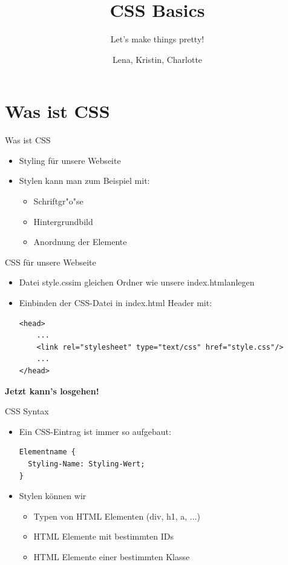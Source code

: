\documentclass[18pt]{beamer}
\title[CSS Basics]{CSS Basics}
\subtitle{Let's make things pretty!}
\author{Lena, Kristin, Charlotte}
\begin{document}

\begin{frame}
\titlepage
\end{frame}

\section {Was ist CSS}
\begin{frame}{Was ist CSS}
\begin {itemize}
\item Styling für unsere Webseite
\item Stylen kann man zum Beispiel mit:
\begin{itemize}
\item Schriftgr"o"se
\item Hintergrundbild
\item Anordnung der Elemente
\end{itemize}
\end {itemize}
\end{frame}

\begin{frame}[fragile]{CSS für unsere Webseite}
\begin {itemize}
\item Datei \glqq style.css\grqq im gleichen Ordner wie unsere \glqq index.html\grqq anlegen
\item Einbinden der CSS-Datei in index.html Header mit:
\begin{lstlisting}
<head>
	...
	<link rel="stylesheet" type="text/css" href="style.css"/>
	...
</head>
\end{lstlisting}
\end {itemize}
\pause
\textbf{Jetzt kann's losgehen!}
\end{frame}

\begin{frame}[fragile]{CSS Syntax}
\begin {itemize}
\item Ein CSS-Eintrag ist immer so aufgebaut:
\begin{lstlisting}
Elementname {
  Styling-Name: Styling-Wert;
}
\end{lstlisting}
\item Stylen können wir
\begin{itemize}
\item Typen von HTML Elementen (div, h1, a, ...)
\item HTML Elemente mit bestimmten IDs
\item HTML Elemente einer bestimmten Klasse
\end{itemize}
\end {itemize}
\end{frame}
\end{document}
